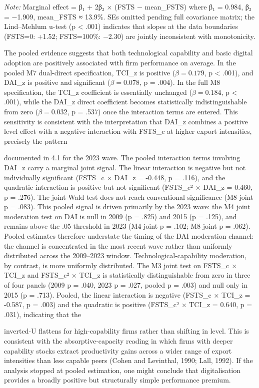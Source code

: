 \documentclass[12pt,a4paper]{article}
\begin{document}
\emph{Note:} Marginal effect = β₁ + 2β₂ × (FSTS − mean\_FSTS) where β₁ =
0.984, β₂ = −1.909, mean\_FSTS ≈ 13.9\%. SEs omitted pending full
covariance matrix; the Lind--Mehlum u-test (p \textless{} .001)
indicates that slopes at the data boundaries (FSTS=0: +1.52; FSTS=100\%:
−2.30) are jointly inconsistent with monotonicity.

The pooled evidence suggests that both technological capability and
basic digital adoption are positively associated with firm performance
on average. In the pooled M7 dual-direct specification, TCI\_z is
positive (\(\beta = 0.179\), p \textless{} .001), and DAI\_z is positive
and significant (\(\beta = 0.078\), p = .004). In the full M8
specification, the TCI\_z coefficient is essentially unchanged
(\(\beta = 0.184\), p \textless{} .001), while the DAI\_z direct
coefficient becomes statistically indistinguishable from zero
(\(\beta = 0.032\), p = .537) once the interaction terms are entered.
This sensitivity is consistent with the interpretation that DAI\_z
combines a positive level effect with a negative interaction with
FSTS\_c at higher export intensities, precisely the pattern

documented in 4.1 for the 2023 wave. The pooled interaction terms
involving DAI\_z carry a marginal joint signal. The linear interaction
is negative but not individually significant (FSTS\_c × DAI\_z = -0.448,
p = .116), and the quadratic interaction is positive but not significant
(FSTS\_c² × DAI\_z = 0.460, p = .276). The joint Wald test does not
reach conventional significance (M8 joint p = .083). This pooled signal
is driven primarily by the 2023 wave: the M4 joint moderation test on
DAI is null in 2009 (p = .825) and 2015 (p = .125), and remains above
the .05 threshold in 2023 (M4 joint p = .102; M8 joint p = .062). Pooled
estimates therefore understate the timing of the DAI moderation channel:
the channel is concentrated in the most recent wave rather than
uniformly distributed across the 2009--2023 window.
Technological-capability moderation, by contrast, is more uniformly
distributed. The M3 joint test on FSTS\_c × TCI\_z and FSTS\_c² × TCI\_z
is statistically distinguishable from zero in three of four panels (2009
p = .040, 2023 p = .027, pooled p = .003) and null only in 2015 (p =
.713). Pooled, the linear interaction is negative (FSTS\_c × TCI\_z =
-0.587, p = .003) and the quadratic is positive (FSTS\_c² × TCI\_z =
0.640, p = .031), indicating that the

inverted-U flattens for high-capability firms rather than shifting in
level. This is consistent with the absorptive-capacity reading in which
firms with deeper capability stocks extract productivity gains across a
wider range of export intensities than less capable peers (Cohen and
Levinthal, 1990; Lall, 1992). If the analysis stopped at pooled
estimation, one might conclude that digitalisation provides a broadly
positive but structurally simple performance premium.
\end{document}
